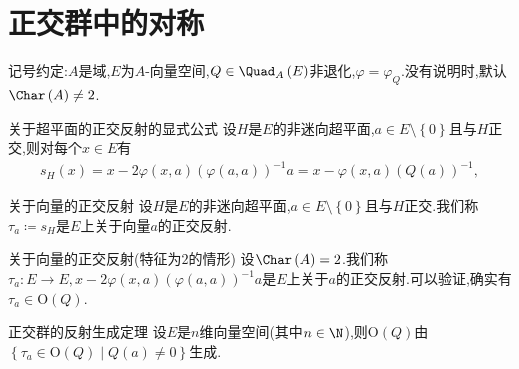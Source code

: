 \section{正交群中的对称}

记号约定:$A$是域,$E$为$A$-向量空间,$Q\in\Quad_{A}\left(E\right)$非退化,$\varphi=\varphi_{Q}$.没有说明时,默认$\Char\left(A\right)\neq 2$.

\begin{lemma}{关于超平面的正交反射的显式公式}{}
	设$H$是$E$的非迷向超平面,$a\in E\setminus\left\{0\right\}$且与$H$正交,则对每个$x\in E$有
	\begin{align*}
		s_{H}\left(x\right)=x-2\varphi\left(x,a\right)\left(\varphi\left(a,a\right)\right)^{-1}a=x-\varphi\left(x,a\right)\left(Q\left(a\right)\right)^{-1},
	\end{align*}
\end{lemma}

\begin{definition}{关于向量的正交反射}{}
	设$H$是$E$的非迷向超平面,$a\in E\setminus\left\{0\right\}$且与$H$正交.我们称$\tau_{a}\coloneq s_{H}$是$E$上关于向量$a$的正交反射.
\end{definition}

\begin{remark}{关于向量的正交反射(特征为$2$的情形)}{}
	设$\Char\left(A\right)=2$.我们称$\tau_{a}:E\to E,x-2\varphi\left(x,a\right)\left(\varphi\left(a,a\right)\right)^{-1}a$是$E$上关于$a$的正交反射.可以验证,确实有$\tau_{a}\in\mathrm{O}\left(Q\right)$.
\end{remark}

\begin{theorem}{正交群的反射生成定理}{}
	设$E$是$n$维向量空间(其中$n\in\N$),则$\mathrm{O}\left(Q\right)$由$\left\{\tau_{a}\in\mathrm{O}\left(Q\right)\middle|Q\left(a\right)\neq 0\right\}$生成.
\end{theorem}